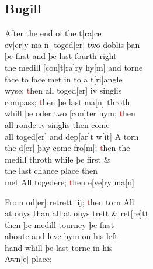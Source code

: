 \documentclass[12pt,letter]{article} %
\newcommand{\red}[1]{\textcolor{red}{#1}}
\newcommand{\srcpg}[1]{
    \noindent{
        \color{Gray}{\rule[0.5ex]{\linewidth}{1pt}~#1} 
    
    }
}
\begin{document}
\subsection{Bugill}
After the end of the t{[}ra{]}ce\\
ev{[}er{]}y ma{[}n{]} toged{[}er{]} two doblis þan \\
þe first and þe last fourth right \\
the medill {[}con{]}t{[}ra{]}ry hy{[}m{]} and torne \\
face to face met in to a t{[}ri{]}angle \\
wyse; \red{t}hen all toged{[}er{]} iv singlis \\
compass; \red{t}hen þe last ma{[}n{]} throth \\
whill þe oder two {[}con{]}ter hym; \red{t}hen \\
all ronde iv singlis then come \\
all toged{[}er{]} and dep{[}ar{]}t w{[}it{]} A torn\\
the d{[}er{]} þay come fro{[}m{]}; \red{t}hen the \\
medill throth while þe first \& \\
the last chance place then \\
met All togedere; \red{t}hen e{[}ve{]}ry ma{[}n{]} \srcpg{59} 
From od{[}er{]} retrett iij; \red{t}hen torn All\\
at onys than all at onys trett \& ret{[}re{]}tt\\
then þe medill tourney þe first\\
aboute and leve hym on his left\\
hand whill þe last torne in his\\
Awn{[}e{]} place;
\end{document}
